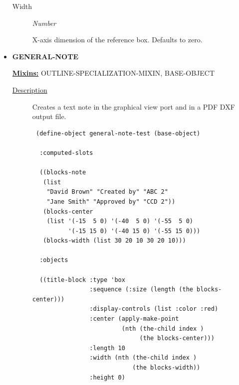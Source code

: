 \documentclass [11pt]{book}
\begin{document}
\begin{itemize}
\begin{description}
\item [Width]
\emph{Number}

 X-axis dimension of the reference box. Defaults to zero.




\end{description}







\item {}
\textbf{GENERAL-NOTE}


\textbf{
\underline{Mixins:}} OUTLINE-SPECIALIZATION-MIXIN, BASE-OBJECT





\begin{description}

\item [
\underline{Description}]


Creates a text note in the graphical view port and in a PDF DXF output file.



\end{description}




\begin{figure}
\begin{lrbox}{\boxedverb}
\begin{minipage}{\linewidth}
{\small

\begin{verbatim} 
 (define-object general-note-test (base-object)
  
  :computed-slots
  
  ((blocks-note 
   (list
    "David Brown" "Created by" "ABC 2"
    "Jane Smith" "Approved by" "CCD 2"))
   (blocks-center 
    (list '(-15  5 0) '(-40  5 0) '(-55  5 0)
          '(-15 15 0) '(-40 15 0) '(-55 15 0)))
   (blocks-width (list 30 20 10 30 20 10)))
  
  :objects 
  
  ((title-block :type 'box
                :sequence (:size (length (the blocks-center)))
                :display-controls (list :color :red)
                :center (apply-make-point 
                         (nth (the-child index ) 
                              (the blocks-center)))
                :length 10
                :width (nth (the-child index ) 
                            (the blocks-width))
                :height 0)


\end{verbatim}}
\end{minipage}
\end{lrbox}
\end{figure}
\end{itemize}
\end{document}
